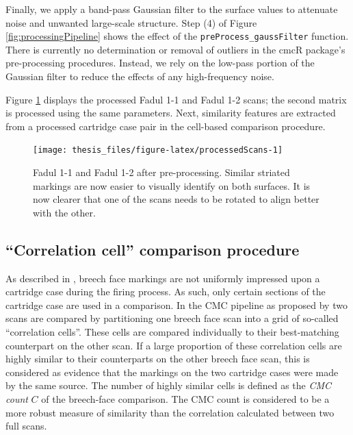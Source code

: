 \documentclass[11pt,]{isuthesis}
\begin{document}
Finally, we apply a band-pass Gaussian filter to the surface values to attenuate noise and unwanted large-scale structure.
Step (4) of Figure \ref{fig:processingPipeline} shows the effect of the \texttt{preProcess\_gaussFilter} function.
There is currently no determination or removal of outliers in the cmcR package's pre-processing procedures.
Instead, we rely on the low-pass portion of the Gaussian filter to reduce the effects of any high-frequency noise.

Figure \ref{fig:processedScans} displays the processed Fadul 1-1 and Fadul 1-2 scans; the second matrix is processed using the same parameters.
Next, similarity features are extracted from a processed cartridge case pair in the cell-based comparison procedure.

\begin{figure}[htbp]

{\centering \texttt{[image: thesis\_files/figure-latex/processedScans-1]} 

}

\caption{Fadul 1-1 and Fadul 1-2 after pre-processing. Similar striated markings are now easier to visually identify on both surfaces. It is now clearer that one of the scans needs to be rotated to align better with the other.}\label{fig:processedScans}
\end{figure}

\hypertarget{comparisonProcedure}{%
\subsection{``Correlation cell'' comparison procedure}\label{comparisonProcedure}}

As described in \citet{song_proposed_2013}, breech face markings are not uniformly impressed upon a cartridge case during the firing process.
As such, only certain sections of the cartridge case are used in a comparison.
In the CMC pipeline as proposed by \citet{song_proposed_2013} two scans are compared by partitioning one breech face scan into a grid of so-called ``correlation cells''.
These cells are compared individually to their best-matching counterpart on the other scan.
If a large proportion of these correlation cells are highly similar to their counterparts on the other breech face scan, this is considered as evidence that the markings on the two cartridge cases were made by the same source.
The number of highly similar cells is defined as the \emph{CMC count} \(C\) \citep{song_proposed_2013} of the breech-face comparison.
The CMC count is considered to be a more robust measure of similarity than the correlation calculated between two full scans.
\end{document}
